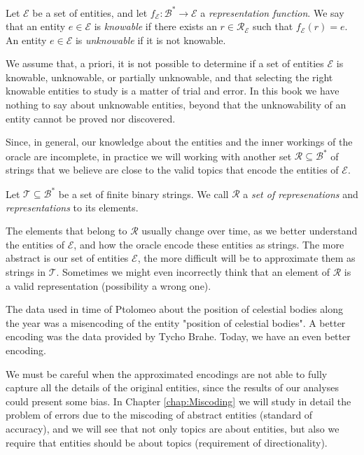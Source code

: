 \begin{definition}
Let $\mathcal{E}$ be a set of entities, and let $f_\mathcal{E}:\mathcal{B}^\ast \rightarrow \mathcal{E}$ a \emph{representation function}. We say that an entity $e \in \mathcal{E}$ is \emph{knowable} if there exists an $r \in \mathcal{R}_\mathcal{E}$ such that $f_\mathcal{E}(r) = e$. An entity $e \in \mathcal{E}$ is \emph{unknowable} if it is not knowable.
\end{definition}

We assume that, a priori, it is not possible to determine if a set of entities $\mathcal{E}$ is knowable, unknowable, or partially unknowable, and that selecting the right knowable entities to study is a matter of trial and error. In this book  we have nothing to say about unknowable entities, beyond that the unknowability of an entity cannot be proved nor discovered.

Since, in general, our knowledge about the entities and the inner workings of the oracle are incomplete, in practice we will working with another set $\mathcal{R} \subseteq \mathcal{B}^\ast$ of strings that we believe are close to the valid topics that encode the entities of $\mathcal{E}$.

\begin{definition}[Topic]
Let $\mathcal{T} \subseteq \mathcal{B}^\ast$ be a set of finite binary strings. We call $\mathcal{R}$ a \emph{set of represenations} and \emph{representations} to its elements.
\end{definition}

The elements that belong to $\mathcal{R}$ usually change over time, as we better understand the entities of $\mathcal{E}$, and how the oracle encode these entities as strings. The more abstract is our set of entities $\mathcal{E}$, the more difficult will be to approximate them as strings in $\mathcal{T}$. Sometimes we might even incorrectly think that an element of $\mathcal{R}$ is a valid representation (possibility a wrong one).

\begin{example}
The data used in time of Ptolomeo about the position of celestial bodies along the year was a misencoding of the entity "position of celestial bodies". A better encoding was the data provided by Tycho Brahe. Today, we have an even better encoding.
\end{example}

We must be careful when the approximated encodings are not able to fully capture all the details of the original entities, since the results of our analyses could present some bias. In Chapter \ref{chap:Miscoding} we will study in detail the problem of errors due to the miscoding of abstract entities (standard of accuracy), and we will see that not only topics are about entities, but also we require that entities should be about topics (requirement of directionality).

